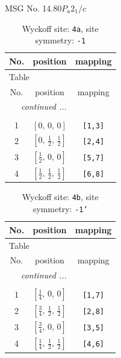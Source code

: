 \documentclass[fleqn,8pt]{jsarticle}
\begin{document}
\setcounter{MaxMatrixCols}{32}

\renewcommand{\tablename}{Table~}
\renewcommand{\figurename}{Figure~}
\begin{center}
\LARGE
MSG No. 14.80\quad$P_{a}2_{1}/c$
\end{center}
\renewcommand{\arraystretch}{1.2}
\begin{longtable}{ccc}
\caption{Wyckoff site: {\tt 4a}, site symmetry: {\tt -1}}
 \\
 \hline \hline
No. & position & mapping \\ \hline \endfirsthead

\multicolumn{2}{l}{\tablename\ \thetable{}} \\
 \hline \hline
No. & position & mapping \\ \hline \endhead

 \hline \hline
\multicolumn{2}{r}{\footnotesize\it continued ...} \\ \endfoot

 \hline \hline
\multicolumn{2}{r}{} \\ \endlastfoot

1 & $\left[ 0,\, 0,\, 0 \right]$ & {\tt [1,3]} \\ \hline
2 & $\left[ 0,\, \frac{1}{2},\, \frac{1}{2} \right]$ & {\tt [2,4]} \\ \hline
3 & $\left[ \frac{1}{2},\, 0,\, 0 \right]$ & {\tt [5,7]} \\ \hline
4 & $\left[ \frac{1}{2},\, \frac{1}{2},\, \frac{1}{2} \right]$ & {\tt [6,8]} \\
\end{longtable}
\renewcommand{\arraystretch}{1.2}
\begin{longtable}{ccc}
\caption{Wyckoff site: {\tt 4b}, site symmetry: {\tt -1'}}
 \\
 \hline \hline
No. & position & mapping \\ \hline \endfirsthead

\multicolumn{2}{l}{\tablename\ \thetable{}} \\
 \hline \hline
No. & position & mapping \\ \hline \endhead

 \hline \hline
\multicolumn{2}{r}{\footnotesize\it continued ...} \\ \endfoot

 \hline \hline
\multicolumn{2}{r}{} \\ \endlastfoot

1 & $\left[ \frac{1}{4},\, 0,\, 0 \right]$ & {\tt [1,7]} \\ \hline
2 & $\left[ \frac{3}{4},\, \frac{1}{2},\, \frac{1}{2} \right]$ & {\tt [2,8]} \\ \hline
3 & $\left[ \frac{3}{4},\, 0,\, 0 \right]$ & {\tt [3,5]} \\ \hline
4 & $\left[ \frac{1}{4},\, \frac{1}{2},\, \frac{1}{2} \right]$ & {\tt [4,6]} \\
\end{longtable}
\end{document}
